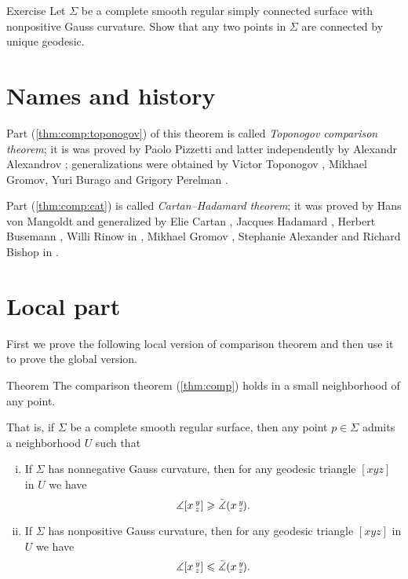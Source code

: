 \begin{thm}{Exercise}
Let $\Sigma$ be a complete smooth regular simply connected surface with nonpositive Gauss curvature.
Show that any two points in $\Sigma$ are connected by unique geodesic.
\end{thm}


\section{Names and history}

Part (\ref{thm:comp:toponogov}) of this theorem is called \emph{Toponogov comparison theorem};
it is was proved by Paolo Pizzetti \cite{pizzetti} and latter independently by Alexandr Alexandrov \cite{alexandrov}; generalizations were obtained by  Victor Toponogov \cite{toponogov}, Mikhael Gromov, Yuri Burago and Grigory Perelman \cite{BGP}.

Part (\ref{thm:comp:cat}) is called \emph{Cartan--Hadamard theorem};
it was proved by 
Hans von Mangoldt \cite{mangoldt} and generalized by Elie Cartan \cite{cartan}, Jacques Hadamard \cite{hadamard},
Herbert Busemann \cite{busemann},
Willi Rinow in \cite{rinow},
Mikhael Gromov \cite[p.119]{gromov},
Stephanie Alexander and Richard Bishop in \cite{a-b:h-c}.

\section{Local part}

First we prove the following local version of comparison theorem and then use it to prove the global version.

\begin{thm}{Theorem}
The comparison theorem (\ref{thm:comp}) holds in a small neighborhood of any point.

That is, if $\Sigma$ be a complete smooth regular surface,
then any point $p\in \Sigma$ admits a neighborhood $U$ such that 
\begin{enumerate}[(i)]
 \item If $\Sigma$ has nonnegative Gauss curvature, then for any geodesic triangle $[xyz]$ in $U$ we have
 \[\measuredangle[x\,{}^{y}_{z}]\geqslant\tilde\measuredangle(x\,{}^{y}_{z}\hspace{-0.2ex}).\]
 \item If $\Sigma$ has nonpositive Gauss curvature, then for any geodesic triangle $[xyz]$ in $U$ we have
 \[\measuredangle[x\,{}^{y}_{z}]\leqslant\tilde\measuredangle(x\,{}^{y}_{z}\hspace{-0.2ex}).\]
\end{enumerate}
\end{thm}

